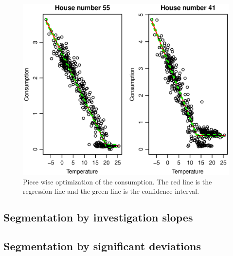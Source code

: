 \begin{figure}[H]
    \centering
    \includegraphics[width=\textwidth]{../../../figures/Consumption-PW.eps}
    \caption{Piece wise optimization of the consumption. The red line is the regression line and the green line is the confidence interval.}
    \label{fig: Consumption-PW}
\end{figure}
\subsection{Segmentation by investigation slopes}

\subsection{Segmentation by significant deviations}



